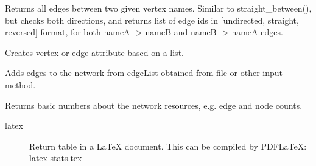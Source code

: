 \documentclass[letterpaper,10pt,english]{sphinxmanual}
\begin{document}
\begin{fulllineitems}
\begin{fulllineitems}
\end{fulllineitems}


\begin{fulllineitems}
\label{\detokenize{main:pypath.main.PyPath.all_between}}
Returns all edges between two given vertex names. Similar to
straight\_between(), but checks both directions, and returns
list of edge ids in {[}undirected, straight, reversed{]} format,
for both nameA -\textgreater{} nameB and nameB -\textgreater{} nameA edges.

\end{fulllineitems}


\begin{fulllineitems}
\label{\detokenize{main:pypath.main.PyPath.apply_list}}
Creates vertex or edge attribute based on a list.

\end{fulllineitems}


\begin{fulllineitems}
\label{\detokenize{main:pypath.main.PyPath.attach_network}}
Adds edges to the network from edgeList obtained from file or
other input method.

\end{fulllineitems}


\begin{fulllineitems}
\label{\detokenize{main:pypath.main.PyPath.basic_stats}}
Returns basic numbers about the network resources, e.g. edge and
node counts.
\begin{description}
\item[{latex}] \leavevmode
Return table in a LaTeX document. This can be compiled by
PDFLaTeX:
latex stats.tex


\end{description}
\end{fulllineitems}
\end{fulllineitems}
\end{document}
